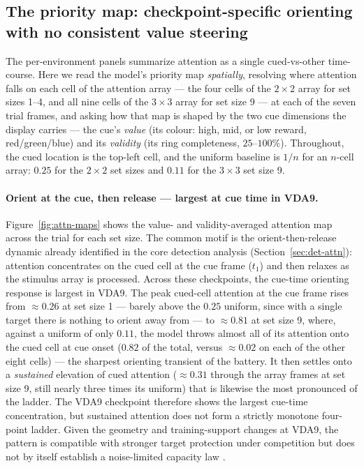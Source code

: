 \subsection{The priority map: checkpoint-specific orienting with no consistent value steering}
\label{sec:vda-map}

The per-environment panels summarize attention as a single cued-vs-other time-course.
Here we read the model's priority map \emph{spatially}, resolving where attention
falls on each cell of the attention array --- the four cells of the $2\times2$ array for
set sizes 1--4, and all nine cells of the $3\times3$ array for set size 9 --- at each of
the seven trial frames, and asking how that map is shaped by the two cue dimensions the
display carries --- the cue's \emph{value} (its colour: high, mid, or low reward,
red/green/blue) and its \emph{validity} (its ring completeness, $25$--$100\%$).
Throughout, the cued location is the top-left cell, and the uniform baseline is $1/n$ for
an $n$-cell array: $0.25$ for the $2\times2$ set sizes and $0.11$ for the $3\times3$ set
size 9.

\paragraph{Orient at the cue, then release --- largest at cue time in VDA9.}
Figure~\ref{fig:attn-maps} shows the value- and validity-averaged attention map across
the trial for each set size. The common motif is the orient-then-release dynamic
already identified in the core detection analysis (Section~\ref{sec:det-attn}):
attention concentrates on the cued cell at the cue frame ($t_1$) and then relaxes
as the stimulus array is processed. Across these checkpoints, the cue-time
orienting response is largest in VDA9. The peak
cued-cell attention at the cue frame rises from $\approx 0.26$ at set size 1 --- barely
above the $0.25$ uniform, since with a single target there is nothing to orient away from
--- to $\approx 0.81$ at set size 9, where, against a uniform of only $0.11$, the model
throws almost all of its attention onto the cued cell at cue onset ($0.82$ of the total,
versus $\approx 0.02$ on each of the other eight cells) --- the sharpest orienting
transient of the battery. It then settles onto a \emph{sustained} elevation of cued
attention ($\approx 0.31$ through the array frames at set size 9, still nearly three times
its uniform) that is likewise the most pronounced of the ladder. The VDA9 checkpoint therefore shows the largest cue-time concentration, but sustained
attention does not form a strictly monotone four-point ladder. Given the geometry and
training-support changes at VDA9, the pattern is compatible with stronger target
protection under competition but does not by itself establish a noise-limited capacity
law \cite{carrasco2011_visual_attention_25y,%
reynolds_heeger2009_normalization}.

